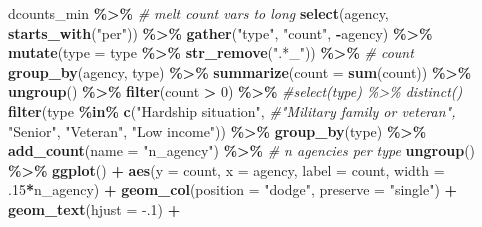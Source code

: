\documentclass[
]{article}
\newenvironment{Shaded}{\begin{snugshade}}{\end{snugshade}}
\newcommand{\CommentTok}[1]{\textcolor[rgb]{0.56,0.35,0.01}{\textit{#1}}}
\newcommand{\DataTypeTok}[1]{\textcolor[rgb]{0.13,0.29,0.53}{#1}}
\newcommand{\DecValTok}[1]{\textcolor[rgb]{0.00,0.00,0.81}{#1}}
\newcommand{\FloatTok}[1]{\textcolor[rgb]{0.00,0.00,0.81}{#1}}
\newcommand{\KeywordTok}[1]{\textcolor[rgb]{0.13,0.29,0.53}{\textbf{#1}}}
\newcommand{\NormalTok}[1]{#1}
\newcommand{\OperatorTok}[1]{\textcolor[rgb]{0.81,0.36,0.00}{\textbf{#1}}}
\newcommand{\StringTok}[1]{\textcolor[rgb]{0.31,0.60,0.02}{#1}}
\begin{document}
\begin{Shaded}
\begin{Highlighting}[]
\NormalTok{dcounts\_min }\OperatorTok{\%\textgreater{}\%}\StringTok{ }
\StringTok{  }\CommentTok{\# melt count vars to long}
\StringTok{  }\KeywordTok{select}\NormalTok{(agency, }\KeywordTok{starts\_with}\NormalTok{(}\StringTok{"per"}\NormalTok{)) }\OperatorTok{\%\textgreater{}\%}\StringTok{ }
\StringTok{  }\KeywordTok{gather}\NormalTok{(}\StringTok{"type"}\NormalTok{, }\StringTok{"count"}\NormalTok{, }\OperatorTok{{-}}\NormalTok{agency) }\OperatorTok{\%\textgreater{}\%}
\StringTok{  }\KeywordTok{mutate}\NormalTok{(}\DataTypeTok{type =}\NormalTok{ type }\OperatorTok{\%\textgreater{}\%}\StringTok{ }\KeywordTok{str\_remove}\NormalTok{(}\StringTok{".*\_"}\NormalTok{)) }\OperatorTok{\%\textgreater{}\%}
\StringTok{  }\CommentTok{\# count}
\StringTok{  }\KeywordTok{group\_by}\NormalTok{(agency, type) }\OperatorTok{\%\textgreater{}\%}\StringTok{ }
\StringTok{  }\KeywordTok{summarize}\NormalTok{(}\DataTypeTok{count =} \KeywordTok{sum}\NormalTok{(count)) }\OperatorTok{\%\textgreater{}\%}\StringTok{ }
\StringTok{  }\KeywordTok{ungroup}\NormalTok{() }\OperatorTok{\%\textgreater{}\%}
\StringTok{  }\KeywordTok{filter}\NormalTok{(count }\OperatorTok{\textgreater{}}\StringTok{ }\DecValTok{0}\NormalTok{) }\OperatorTok{\%\textgreater{}\%}\StringTok{ }\CommentTok{\#select(type) \%\textgreater{}\% distinct()}
\StringTok{  }\KeywordTok{filter}\NormalTok{(type }\OperatorTok{\%in\%}\StringTok{ }\KeywordTok{c}\NormalTok{(}\StringTok{"Hardship situation"}\NormalTok{,}
  \CommentTok{\#"Military family or veteran",}
  \StringTok{"Senior"}\NormalTok{,}
  \StringTok{"Veteran"}\NormalTok{,}
  \StringTok{"Low income"}\NormalTok{)) }\OperatorTok{\%\textgreater{}\%}
\StringTok{  }\KeywordTok{group\_by}\NormalTok{(type) }\OperatorTok{\%\textgreater{}\%}\StringTok{ }
\StringTok{  }\KeywordTok{add\_count}\NormalTok{(}\DataTypeTok{name =} \StringTok{"n\_agency"}\NormalTok{) }\OperatorTok{\%\textgreater{}\%}\StringTok{ }\CommentTok{\# n agencies per type }
\StringTok{    }\KeywordTok{ungroup}\NormalTok{() }\OperatorTok{\%\textgreater{}\%}
\StringTok{  }\KeywordTok{ggplot}\NormalTok{() }\OperatorTok{+}\StringTok{ }
\StringTok{  }\KeywordTok{aes}\NormalTok{(}\DataTypeTok{y =}\NormalTok{ count, }\DataTypeTok{x =}\NormalTok{ agency, }\DataTypeTok{label =}\NormalTok{ count, }\DataTypeTok{width =} \FloatTok{.15}\OperatorTok{*}\NormalTok{n\_agency) }\OperatorTok{+}
\StringTok{  }\KeywordTok{geom\_col}\NormalTok{(}\DataTypeTok{position =} \StringTok{"dodge"}\NormalTok{, }\DataTypeTok{preserve =} \StringTok{"single"}\NormalTok{) }\OperatorTok{+}
\StringTok{  }\KeywordTok{geom\_text}\NormalTok{(}\DataTypeTok{hjust =} \FloatTok{{-}.1}\NormalTok{) }\OperatorTok{+}\StringTok{ }

\end{Highlighting}
\end{Shaded}
\end{document}
